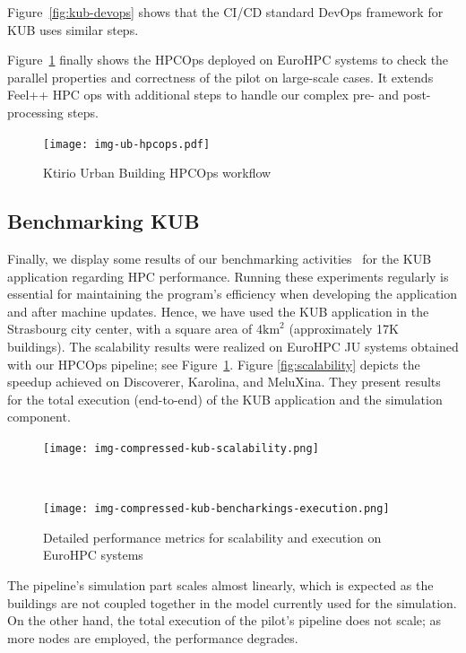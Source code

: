 \documentclass[runningheads]{llncs}
\begin{document}
Figure~\ref{fig:kub-devops} shows that the CI/CD standard DevOps framework for KUB uses similar steps.



Figure~\ref{fig:kub-hpcops} finally shows the HPCOps deployed on EuroHPC systems to check the parallel properties and correctness of the pilot on large-scale cases. It extends Feel++ HPC ops with additional steps to handle our complex pre- and post-processing steps.

\begin{figure}
    \centering
    \texttt{[image: img-ub-hpcops.pdf]}
    \caption{Ktirio Urban Building HPCOps workflow}
    \label{fig:kub-hpcops}
\end{figure}

\subsection{Benchmarking KUB}

Finally, we display some results of our benchmarking activities~\cite{hidalgo2_d31_2024} for the KUB application regarding HPC performance. Running these experiments regularly is essential for maintaining the program's efficiency when developing the application and after machine updates. 
Hence, we have used the KUB application in the Strasbourg city center, with a square area of $4 \mathrm{km}^2$ (approximately 17K buildings). The scalability results were realized on EuroHPC JU systems obtained with our HPCOps pipeline; see Figure~\ref{fig:kub-hpcops}. Figure \ref{fig:scalability} depicts the speedup achieved on Discoverer, Karolina, and MeluXina. They present results for the total execution (end-to-end) of the KUB application and the simulation component.

\begin{figure}  %
  \centering
  \begin{subfloat}{
    \texttt{[image: img-compressed-kub-scalability.png]}
    \label{fig:scalability}
  }\end{subfloat}
  \\
  \begin{subfloat}{
    \texttt{[image: img-compressed-kub-bencharkings-execution.png]}
    \label{fig:execution-breakdown}
  }\end{subfloat}
  \caption{Detailed performance metrics for scalability and execution on EuroHPC systems}
  \label{fig:combined-metrics}
\end{figure}
The pipeline's simulation part scales almost linearly, which is expected as the buildings are not coupled together in the model currently used for the simulation. On the other hand, the total execution of the pilot's pipeline does not scale; as more nodes are employed, the performance degrades.
\end{document}
